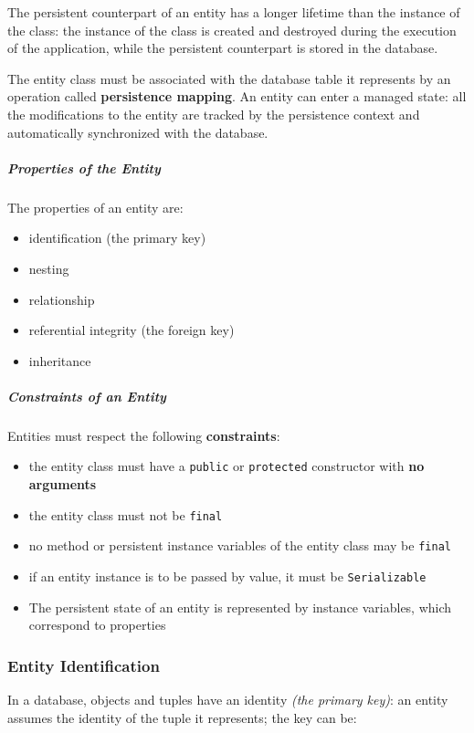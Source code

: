 \documentclass[english]{article}
\begin{document}
The persistent counterpart of an entity has a longer lifetime than the instance of the class:
the instance of the class is created and destroyed during the execution of the application, while the persistent counterpart is stored in the database.

The entity class must be associated with the database table it represents by an operation called \textbf{persistence mapping}.
An entity can enter a managed state: all the modifications to the entity are tracked by the persistence context and automatically synchronized with the database.

\subparagraph*{Properties of the Entity}
The properties of an entity are:

\begin{itemize}
  \item identification (the primary key)
  \item nesting
  \item relationship
  \item referential integrity (the foreign key)
  \item inheritance
\end{itemize}

\subparagraph*{Constraints of an Entity}

Entities must respect the following \textbf{constraints}:

\begin{itemize}
  \item the entity class must have a \texttt{public} or \texttt{protected} constructor with \textbf{no arguments}
  \item the entity class must not be \texttt{final}
  \item no method or persistent instance variables of the entity class may be \texttt{final}
  \item if an entity instance is to be passed by value, it must be \texttt{Serializable}
  \item The persistent state of an entity is represented by instance variables, which correspond to \javab properties
\end{itemize}

\subsubsection{Entity Identification}
In a database, objects and tuples have an identity \textit{(the primary key)}: an entity assumes the identity of the tuple it represents;
the key can be:
\end{document}
